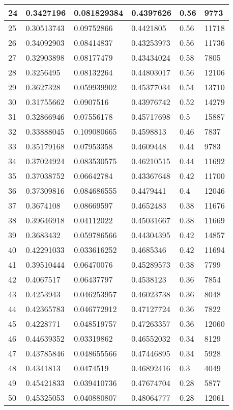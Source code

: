 \begin{longtable}{|l|l|l|l|l|l|}
24 & 0.3427196 & 0.081829384 & 0.4397626 & 0.56 & 9773 \\ \hline 
25 & 0.30513743 & 0.09752866 & 0.4421805 & 0.56 & 11718 \\ \hline 
26 & 0.34092903 & 0.08414837 & 0.43253973 & 0.56 & 11736 \\ \hline 
27 & 0.32903898 & 0.08177479 & 0.43434024 & 0.58 & 7805 \\ \hline 
28 & 0.3256495 & 0.08132264 & 0.44803017 & 0.56 & 12106 \\ \hline 
29 & 0.3627328 & 0.059939902 & 0.45377034 & 0.54 & 13710 \\ \hline 
30 & 0.31755662 & 0.0907516 & 0.43976742 & 0.52 & 14279 \\ \hline 
31 & 0.32866946 & 0.07556178 & 0.45717698 & 0.5 & 15887 \\ \hline 
32 & 0.33888045 & 0.109080665 & 0.4598813 & 0.46 & 7837 \\ \hline 
33 & 0.35179168 & 0.07953358 & 0.4609448 & 0.44 & 9783 \\ \hline 
34 & 0.37024924 & 0.083530575 & 0.46210515 & 0.44 & 11692 \\ \hline 
35 & 0.37038752 & 0.06642784 & 0.43367648 & 0.42 & 11700 \\ \hline 
36 & 0.37309816 & 0.084686555 & 0.4479441 & 0.4 & 12046 \\ \hline 
37 & 0.3674108 & 0.08669597 & 0.4652483 & 0.38 & 11676 \\ \hline 
38 & 0.39646918 & 0.04112022 & 0.45031667 & 0.38 & 11669 \\ \hline 
39 & 0.3683432 & 0.059786566 & 0.44304395 & 0.42 & 14857 \\ \hline 
40 & 0.42291033 & 0.033616252 & 0.4685346 & 0.42 & 11694 \\ \hline 
41 & 0.39510444 & 0.06470076 & 0.45289573 & 0.38 & 7799 \\ \hline 
42 & 0.4067517 & 0.06437797 & 0.4538123 & 0.36 & 7854 \\ \hline 
43 & 0.4253943 & 0.046253957 & 0.46023738 & 0.36 & 8048 \\ \hline 
44 & 0.42365783 & 0.046772912 & 0.47127724 & 0.36 & 7822 \\ \hline 
45 & 0.4228771 & 0.048519757 & 0.47263357 & 0.36 & 12060 \\ \hline 
46 & 0.44639352 & 0.03319862 & 0.46552032 & 0.34 & 8129 \\ \hline 
47 & 0.43785846 & 0.048655566 & 0.47446895 & 0.34 & 5928 \\ \hline 
48 & 0.4341813 & 0.0474519 & 0.46892416 & 0.3 & 4049 \\ \hline 
49 & 0.45421833 & 0.039410736 & 0.47674704 & 0.28 & 5877 \\ \hline 
50 & 0.45325053 & 0.040880807 & 0.48064777 & 0.28 & 12061 \\ \hline 
\end{longtable}